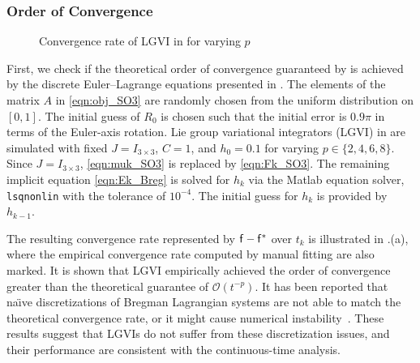 \documentclass[letterpaper, 10pt, conference]{ieeeconf}
\newcommand{\bracket}[1]{\ensuremath{\left[ #1 \right]}}
\newcommand{\tr}[1]{\mbox{tr}\ensuremath{\negthickspace\bracket{#1}}}
\renewcommand{\L}{\ensuremath{\mathsf{L}}}
\renewcommand{\Re}{\ensuremath{\mathbb{R}}}
\newcommand{\D}{\ensuremath{\mathbf{D}}}
\begin{document}

\subsubsection{Order of Convergence}

\begin{figure}
    \centerline{
    }
    \centerline{
    }
    \caption{Convergence rate of LGVI in  for varying $p$}\label{fig:conv}
\end{figure}

First, we check if the theoretical order of convergence guaranteed by  is achieved by the discrete Euler--Lagrange equations presented in .
The elements of the matrix $A$ in \eqref{eqn:obj_SO3} are randomly chosen from the uniform distribution on $[0,1]$.
The initial guess of $R_0$ is chosen such that the initial error is $0.9\pi$ in terms of the Euler-axis rotation. 
Lie group variational integrators (LGVI) in  are simulated with fixed $J=I_{3\times 3}$, $C=1$, and $h_0 = 0.1$ for varying $p\in\{2,4,6,8\}$. 
Since $J=I_{3\times 3}$, \eqref{eqn:muk_SO3} is replaced by \eqref{eqn:Fk_SO3}.
The remaining implicit equation \eqref{eqn:Ek_Breg} is solved for $h_k$ via the Matlab equation solver, \texttt{lsqnonlin} with the tolerance of $10^{-4}$.
The initial guess for $h_k$ is provided by $h_{k-1}$. 

The resulting convergence rate represented by $\mathsf{f}-\mathsf{f}^*$ over $t_k$ is illustrated in .(a), where the empirical convergence rate computed by manual fitting are also marked. 
It is shown that LGVI empirically achieved the order of convergence greater than the theoretical guarantee of $\mathcal{O}(t^{-p})$.
It has been reported that na\"\i ve discretizations of Bregman Lagrangian systems are not able to match the theoretical convergence rate, or it might cause numerical instability~\cite{wibisono2016variational,betancourt2018symplectic}.
These results suggest that LGVIs do not suffer from these discretization issues, and their performance are consistent with the continuous-time analysis. 
\end{document}
